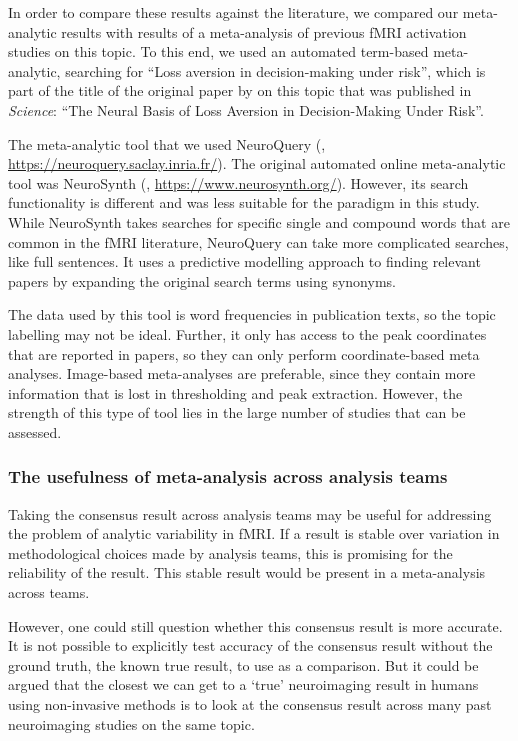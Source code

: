 \documentclass[a4paper,doc,natbib]{apa6}
\begin{document}
In order to compare these results against the literature, we compared our meta-analytic results with results of a meta-analysis of previous fMRI activation studies on this topic. To this end, we used an automated term-based meta-analytic, searching for ``Loss aversion in decision-making under risk'', which is part of the title of the original paper by \cite{tom_neural_2007} on this topic that was published in \textit{Science}: ``The Neural Basis of Loss Aversion in Decision-Making Under Risk''.

The meta-analytic tool that we used NeuroQuery (\citealp{dockes2018text}, \url{https://neuroquery.saclay.inria.fr/}). The original automated online meta-analytic tool was NeuroSynth (\citealp{yarkoni2011large}, \url{https://www.neurosynth.org/}). However, its search functionality is different and was less suitable for the paradigm in this study. While NeuroSynth takes searches for specific single and compound words that are common in the fMRI literature, NeuroQuery can take more complicated searches, like full sentences. It uses a predictive modelling approach to finding relevant papers by expanding the original search terms using synonyms.

The data used by this tool is word frequencies in publication texts, so the topic labelling may not be ideal. Further, it only has access to the peak coordinates that are reported in papers, so they can only perform coordinate-based meta analyses. Image-based meta-analyses are preferable, since they contain more information that is lost in thresholding and peak extraction. However, the strength of this type of tool lies in the large number of studies that can be assessed.

\subsubsection{The usefulness of meta-analysis across analysis teams}

Taking the consensus result across analysis teams may be useful for addressing the problem of analytic variability in fMRI. If a result is stable over variation in methodological choices made by analysis teams, this is promising for the reliability of the result. This stable result would be present in a meta-analysis across teams. 

However, one could still question whether this consensus result is more accurate. It is not possible to explicitly test accuracy of the consensus result without the ground truth, the known true result, to use as a comparison. But it could be argued that the closest we can get to a `true' neuroimaging result in humans using non-invasive methods is to look at the consensus result across many past neuroimaging studies on the same topic. 
\end{document}
